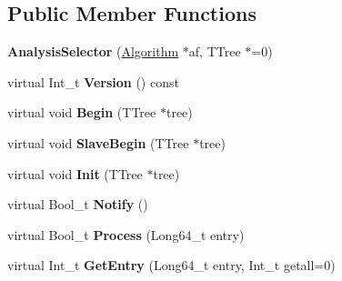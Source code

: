 \subsection*{Public Member Functions}
\begin{DoxyCompactItemize}
\item 
\hypertarget{class_h_a_l_1_1_analysis_selector_a0e69d567472b846500e3758d0e1cafd3}{{\bfseries Analysis\-Selector} (\hyperlink{class_h_a_l_1_1_algorithm}{Algorithm} $\ast$af, T\-Tree $\ast$=0)}\label{class_h_a_l_1_1_analysis_selector_a0e69d567472b846500e3758d0e1cafd3}

\item 
\hypertarget{class_h_a_l_1_1_analysis_selector_a674eacd53bc6d9b2b82d5769ecf4c965}{virtual Int\-\_\-t {\bfseries Version} () const }\label{class_h_a_l_1_1_analysis_selector_a674eacd53bc6d9b2b82d5769ecf4c965}

\item 
\hypertarget{class_h_a_l_1_1_analysis_selector_aee810e2db449acf3c75cf0c7ed085318}{virtual void {\bfseries Begin} (T\-Tree $\ast$tree)}\label{class_h_a_l_1_1_analysis_selector_aee810e2db449acf3c75cf0c7ed085318}

\item 
\hypertarget{class_h_a_l_1_1_analysis_selector_a47feee7290d251295e65bc69b4e5b982}{virtual void {\bfseries Slave\-Begin} (T\-Tree $\ast$tree)}\label{class_h_a_l_1_1_analysis_selector_a47feee7290d251295e65bc69b4e5b982}

\item 
\hypertarget{class_h_a_l_1_1_analysis_selector_a73f70c38aab67b59e030bfa3e5182d3c}{virtual void {\bfseries Init} (T\-Tree $\ast$tree)}\label{class_h_a_l_1_1_analysis_selector_a73f70c38aab67b59e030bfa3e5182d3c}

\item 
\hypertarget{class_h_a_l_1_1_analysis_selector_a5ce023e4ee2bbc1d6ea0437175258195}{virtual Bool\-\_\-t {\bfseries Notify} ()}\label{class_h_a_l_1_1_analysis_selector_a5ce023e4ee2bbc1d6ea0437175258195}

\item 
\hypertarget{class_h_a_l_1_1_analysis_selector_ad89da1b73776f3acd5e8200d51438e47}{virtual Bool\-\_\-t {\bfseries Process} (Long64\-\_\-t entry)}\label{class_h_a_l_1_1_analysis_selector_ad89da1b73776f3acd5e8200d51438e47}

\item 
\hypertarget{class_h_a_l_1_1_analysis_selector_ae34c9fc9d657cea4c277306043997440}{virtual Int\-\_\-t {\bfseries Get\-Entry} (Long64\-\_\-t entry, Int\-\_\-t getall=0)}\label{class_h_a_l_1_1_analysis_selector_ae34c9fc9d657cea4c277306043997440}


\end{DoxyCompactItemize}
